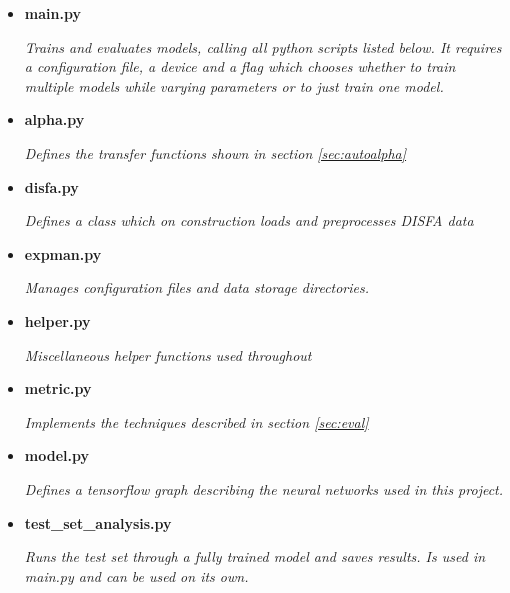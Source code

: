 {\begin{itemize}
\begin{itemize}
                  \begin{sloppypar} \textit{Used by viewResult.ipynb and compareResults.ipynb to open an exisiting experiment, plot it's results and load it's results.}\end{sloppypar}
                  \item {\bf main.py }
                  \begin{sloppypar} \textit{Trains and evaluates models, calling all python scripts listed below. It requires a configuration file, a device and a flag which chooses whether to train multiple models while varying parameters or to just train one model.}\end{sloppypar}
                  \item {\bf alpha.py }
                  \begin{sloppypar} \textit{Defines the transfer functions shown in section \ref{sec:autoalpha} }\end{sloppypar}
                  \item {\bf disfa.py }
                  \begin{sloppypar} \textit{Defines a class which on construction loads and preprocesses DISFA data}\end{sloppypar}
                  \item {\bf expman.py }
                  \begin{sloppypar} \textit{Manages configuration files and data storage directories.}\end{sloppypar}
                  \item {\bf helper.py }
                  \begin{sloppypar} \textit{Miscellaneous helper functions used throughout}\end{sloppypar}
                  \item {\bf metric.py }
                  \begin{sloppypar} \textit{Implements the techniques described in section \ref{sec:eval} }\end{sloppypar}
                  \item {\bf model.py }
                  \begin{sloppypar} \textit{Defines a tensorflow graph describing the neural networks used in this project.}\end{sloppypar}
                  \item {\bf test\_set\_analysis.py }
                  \begin{sloppypar} \textit{Runs the test set through a fully trained model and saves results. Is used in main.py and can be used on its own.}\end{sloppypar}

\end{itemize}
\end{itemize}}

